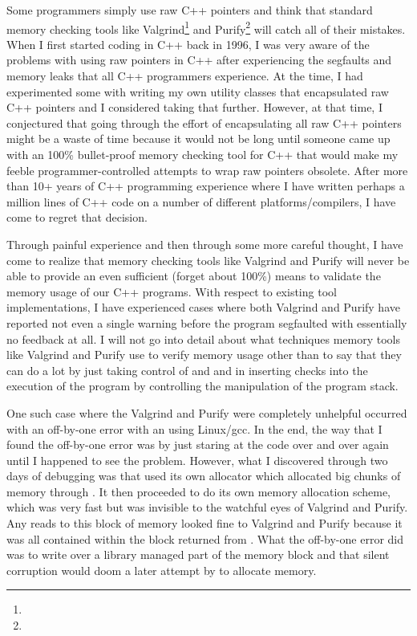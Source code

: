 \documentclass[pdf,ps2pdf,11pt]{SANDreport}
\begin{document}
Some programmers simply use raw C++ pointers and think that standard
memory checking tools like
Valgrind\footnote{{}} and
Purify\footnote{}
will catch all of their mistakes.  When I first started coding in C++
back in 1996, I was very aware of the problems with using raw pointers
in C++ after experiencing the segfaults and memory leaks that all C++
programmers experience.  At the time, I had experimented some with
writing my own utility classes that encapsulated raw C++ pointers and
I considered taking that further.  However, at that time, I
conjectured that going through the effort of encapsulating all raw C++
pointers might be a waste of time because it would not be long until
someone came up with an 100\% bullet-proof memory checking tool for
C++ that would make my feeble programmer-controlled attempts to wrap
raw pointers obsolete.  After more than 10+ years of C++ programming
experience where I have written perhaps a million lines of C++ code on
a number of different platforms/compilers, I have come to regret that
decision.

Through painful experience and then through some more careful thought,
I have come to realize that memory checking tools like Valgrind and
Purify will never be able to provide an even sufficient (forget about
100\%) means to validate the memory usage of our C++ programs.  With
respect to existing tool implementations, I have experienced cases
where both Valgrind and Purify have reported not even a single warning
before the program segfaulted with essentially no feedback at all.  I
will not go into detail about what techniques memory tools like
Valgrind and Purify use to verify memory usage other than to say that
they can do a lot by just taking control of {} and
{} and in inserting checks into the execution of the
program by controlling the manipulation of the program stack.

One such case where the Valgrind and Purify were completely unhelpful
occurred with an off-by-one error with an {} using
Linux/gcc.  In the end, the way that I found the off-by-one error was
by just staring at the code over and over again until I happened to
see the problem.  However, what I discovered through two days of
debugging was that {} used its own allocator which
allocated big chunks of memory through {}.  It
then proceeded to do its own memory allocation scheme, which was very
fast but was invisible to the watchful eyes of Valgrind and Purify.
Any reads to this block of memory looked fine to Valgrind and Purify
because it was all contained within the block returned from
{}.  What the off-by-one error did was to write
over a library managed part of the memory block and that silent
corruption would doom a later attempt by {} to
allocate memory.
\end{document}
